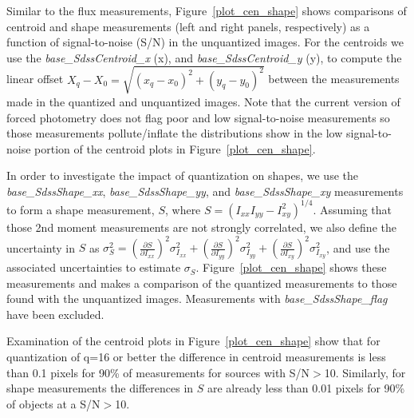 Similar to the flux measurements, Figure~\ref{plot_cen_shape} shows comparisons of centroid
and shape measurements (left and right panels, respectively) as a function of signal-to-noise
(S/N) in the unquantized images.  For the centroids we use the {\it base\_SdssCentroid\_x} (x), and 
{\it base\_SdssCentroid\_y} (y), to compute the linear offset 
$X_q-X_0 = \sqrt{ (x_q-x_0)^2 + (y_q-y_0)^2}$ between the measurements
made in the quantized and unquantized images.  Note that the current version of forced photometry 
does not flag poor and low signal-to-noise measurements so those measurements pollute/inflate the 
distributions show in the low signal-to-noise portion of the centroid plots in Figure~\ref{plot_cen_shape}.

In order to investigate the impact of quantization on shapes, we use the {\it base\_SdssShape\_xx}, 
{\it base\_SdssShape\_yy}, and {\it base\_SdssShape\_xy} measurements to form a shape measurement, 
$S$, where $S=(I_{xx} I_{yy} - I_{xy}^2)^{1/4}$.
Assuming that those 2nd moment measurements are not strongly correlated, we also define
the uncertainty in $S$ as 
$\sigma_S^2 = (\frac{\partial S}{\partial I_{xx}})^2 \sigma_{I_{xx}}^2 + 
(\frac{\partial S}{\partial I_{yy}})^2 \sigma_{I_{yy}}^2 + 
(\frac{\partial S}{\partial I_{xy}})^2 \sigma_{I_{xy}}^2$, and use the associated uncertainties
to estimate $\sigma_S$.  Figure~\ref{plot_cen_shape} shows these measurements and makes a comparison
of the quantized measurements to those found with the unquantized images.  Measurements with 
{\it base\_SdssShape\_flag} have been excluded.

Examination of the centroid plots in Figure~\ref{plot_cen_shape} show that for quantization of q=16 or
better the difference in centroid measurements is less than 0.1 pixels for 90\% of measurements for
sources with S/N$>$10.  Similarly, for shape measurements the differences in $S$ are already less than 
0.01 pixels for 90\% of objects at a S/N$>$10.  

